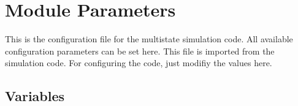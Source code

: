 
\section{Module Parameters}

    \label{Parameters}
This is the configuration file for the multistate simulation code. All
available configuration parameters can be set here. This file is imported
from the simulation code. For configuring the code, just modifiy the values
here.


  \subsection{Variables}

